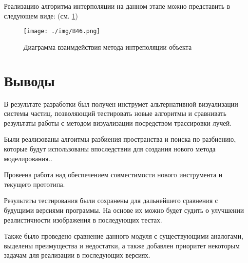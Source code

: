 Реализацию алгоритма интерполяции на данном этапе можно представить в следующем виде: (см. \ref{pic:B46})

\begin{figure} 
\begin{center}
\texttt{[image: ./img/B46.png]}
\end{center}
\caption{Диаграмма взаимдействия метода интреполяции объекта}
\label{pic:B46}
\end{figure}

\section{Выводы}

В результате разработки был получен инструмет альтернативной визуализации системы частиц, позволяющий тестировать новые алгоритмы и сравнивать результаты работы с методом визуализации посредством трассировки лучей.

Были реализованы алгоитмы разбиения пространства и поиска по разбиению, которые будут использованы впоследствии для создания нового метода моделирования..

Провеена работа над обеспечением совместимости нового инструмента и текущего прототипа.

Результаты тестирования были сохранены для дальнейшего сравнения с будущими версиями программы. На основе их можно будет судить о улучшении реалистичности изображения в последующих тестах.

Также было проведено сравнение данного модуля с существующими аналогами, выделены преимущества и недостатки, а также добавлен приоритет некоторым задачам для реализации в последующих версиях.